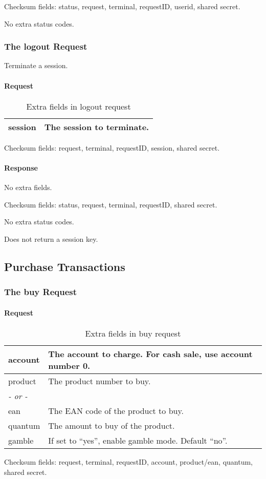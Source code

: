 \documentclass[a4paper,11pt]{article}
\newcommand{\code}[1]
   {\textsf{\mbox{#1}}}
\newcommand{\rightcellwidth}{25em}
\newcommand{\reqsection}[1]
    {\subsubsection{The \code{#1} Request}}
\newcommand{\partsection}[1]
           {\paragraph{#1}}
\begin{document}
Checksum fields: status, request, terminal, requestID, userid, shared secret.

No extra status codes.



\reqsection{logout}

Terminate a session.

\partsection{Request}
\begin{table}[!ht]
  \begin{tabular}{|l|p{\rightcellwidth}|}
    \hline
    session & The session to terminate.\\\hline
  \end{tabular} 
  \caption{Extra fields in \code{logout} request}
\end{table}

Checksum fields: request, terminal, requestID, session,
shared secret. 


\partsection{Response}
No extra fields.

Checksum fields: status, request, terminal, requestID, shared secret.

No extra status codes.

Does not return a session key.


\subsection{Purchase Transactions}

\reqsection{buy}

\partsection{Request}
\begin{table}[!ht]
  \begin{tabular}{|l|p{\rightcellwidth}|}
    \hline
     account & The account to charge. For cash sale, use account
               number 0.\\\hline
     product & The product number to buy.\\
     \multicolumn{2}{l}{\emph{- or -}}\\
     ean     & The EAN code of the product to buy.\\\hline
     quantum & The amount to buy of the product.\\\hline
     gamble  & If set to ``yes'', enable gamble mode. Default ``no''.\\\hline 
  \end{tabular} 
  \caption{Extra fields in \code{buy} request}
\end{table}

Checksum fields: request, terminal, requestID, account, product/ean,
quantum, shared secret.
\end{document}
